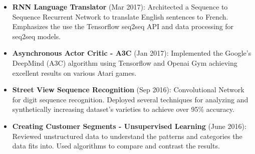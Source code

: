 \documentclass[9pt, a4paper, oneside, final]{scrartcl} %
\begin{document}
\begin{itemize}\itemsep2pt \parskip1.5pt 
\item \textbf{RNN Language Translator} (Mar 2017): Architected a Sequence to Sequence Recurrent Network to translate English sentences to French. Emphasizes the use the Tensorflow seq2seq API and data processing for seq2seq models.

\item \textbf{Asynchronous Actor Critic - A3C} (Jan 2017): Implemented the Google's DeepMind (A3C) algorithm using Tensorflow and Openai Gym achieving excellent results on various Atari games.

\item \textbf{Street View Sequence Recognition} (Sep 2016): Convolutional Network for digit sequence recognition. Deployed several techniques for analyzing and synthetically increasing dataset's varieties to achieve over 95\% accuracy.

\item \textbf{Creating Customer Segments - Unsupervised Learning} (June 2016): Reviewed unstructured data to understand the patterns and categories the data fits into.
Used algorithms to compare and contrast the results.
\end{itemize}
\end{document}
